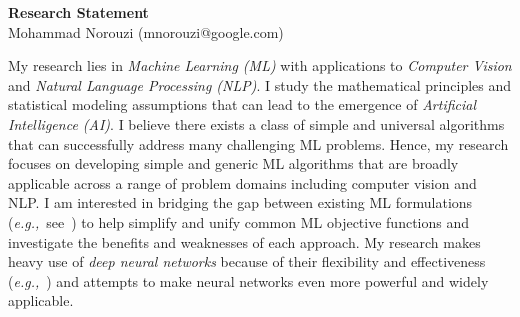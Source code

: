\documentclass[a4paper, 10pt]{article}
\def\eg{{\em e.g.,}}
\begin{document}
\thispagestyle{fancy}
\lhead{}
\rhead{}
\renewcommand{\headrulewidth}{0pt} 
\renewcommand{\footrulewidth}{0pt} 


\pagestyle{fancy}
\lhead{\textcolor{gray}{\it Mohammad Norouzi}}
\rhead{\textcolor{gray}{\thepage/\totalpages{}}}


\begin{center}
{\LARGE \bf Research Statement}\\
\vspace*{0.1cm}
{\normalsize Mohammad Norouzi (mnorouzi@google.com)}
\vspace*{0.2cm}
\end{center}




My research lies in {\em Machine Learning (ML)} with applications to
{\em Computer Vision} and {\em Natural Language Processing (NLP)}. I
study the mathematical principles and statistical modeling assumptions
that can lead to the emergence of {\em Artificial Intelligence (AI)}.
I believe there exists a class of simple and universal algorithms that
can successfully address many challenging ML problems. Hence, my
research focuses on developing simple and generic ML algorithms that
are broadly applicable across a range of problem domains including
computer vision and NLP. I am interested in bridging the gap between
existing ML formulations (\eg~see~\cite{raml,pcl}) to help simplify
and unify common ML objective functions and investigate the benefits
and weaknesses of each approach. My research makes heavy use of {\em
  deep neural networks} because of their flexibility and effectiveness
(\eg~\cite{seq2seq,alphago}) and attempts to make neural networks even
more powerful and widely applicable.
\end{document}
